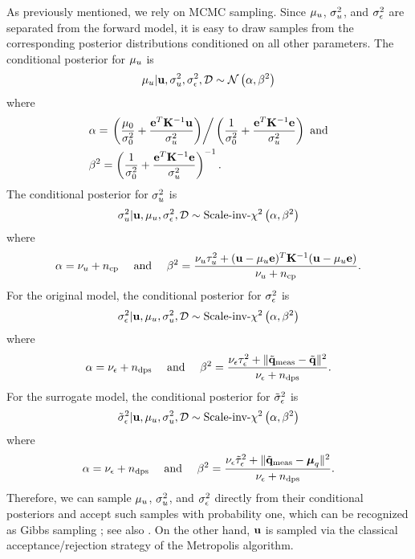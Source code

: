 As previously mentioned, we rely on MCMC sampling. Since $\mu_u$, $\sigma_u^2$, and $\sigma_\epsilon^2$ are separated from the forward model, it is easy to draw samples from the corresponding posterior distributions conditioned on all other parameters. The conditional posterior for $\mu_u$ is
\[
  \mu_u | \mathbf{u}, \sigma_u^2, \sigma_\epsilon^2, \mathcal{D} \sim \mathcal{N}\left( \alpha, \beta^2 \right)
\]
where
\begin{align*}
  & \alpha = \left. \left( \frac{\mu_0}{\sigma_0^2} + \frac{\mathbf{e}^T \mathbf{K}^{-1} \mathbf{u}}{\sigma_u^2} \right) \right/ \left( \frac{1}{\sigma_0^2} + \frac{\mathbf{e}^T \mathbf{K}^{-1} \mathbf{e}}{\sigma_u^2} \right) \text{ and} \\
  & \beta^2 = \left( \frac{1}{\sigma_0^2} + \frac{\mathbf{e}^T \mathbf{K}^{-1} \mathbf{e}}{\sigma_u^2} \right)^{-1}.
\end{align*}
The conditional posterior for $\sigma^2_u$ is
\[
  \sigma_u^2 | \mathbf{u}, \mu_u, \sigma_\epsilon^2, \mathcal{D} \sim \text{Scale-inv-}\chi^2\left( \alpha, \beta^2 \right)
\]
where
\[
  \alpha = \nu_u + {n_\text{cp}} \hspace{1em} \text{ and } \hspace{1em} \beta^2 = \frac{\nu_u \tau^2_u + (\mathbf{u} - \mu_u \mathbf{e})^T\mathbf{K}^{-1}(\mathbf{u} - \mu_u \mathbf{e})}{\nu_u + {n_\text{cp}}}.
\]
For the original model, the conditional posterior for $\sigma^2_\epsilon$ is
\[
  \sigma_\epsilon^2 | \mathbf{u}, \mu_u, \sigma_u^2, \mathcal{D} \sim \text{Scale-inv-}\chi^2\left( \alpha, \beta^2 \right)
\]
where
\[
  \alpha = \nu_\epsilon + {n_\text{dps}} \hspace{1em} \text{ and } \hspace{1em} \beta^2 = \frac{\nu_\epsilon \tau^2_\epsilon + \| \tilde{\mathbf{q}}_{\text{meas}} - \tilde{\mathbf{q}} \|^2}{\nu_\epsilon + {n_\text{dps}}}.
\]
For the surrogate model, the conditional posterior for $\tilde{\sigma}^2_\epsilon$ is
\[
  \tilde{\sigma}_\epsilon^2 | \mathbf{u}, \mu_u, \sigma_u^2, \mathcal{D} \sim \text{Scale-inv-}\chi^2\left( \alpha, \beta^2 \right)
\]
where
\[
  \alpha = \nu_\epsilon + {n_\text{dps}} \hspace{1em} \text{ and } \hspace{1em} \beta^2 = \frac{\nu_\epsilon \tilde{\tau}^2_\epsilon + \| \tilde{\mathbf{q}}_{\text{meas}} - {\boldsymbol\mu}_q \|^2}{\nu_\epsilon + {n_\text{dps}}}.
\]
Therefore, we can sample $\mu_u$, $\sigma_u^2$, and $\sigma_\epsilon^2$ directly from their conditional posteriors and accept such samples with probability one, which can be recognized as Gibbs sampling \cite{gelman2004}; see also \cite{marzouk2009}. On the other hand, $\mathbf{u}$ is sampled via the classical acceptance/rejection strategy of the Metropolis algorithm.
